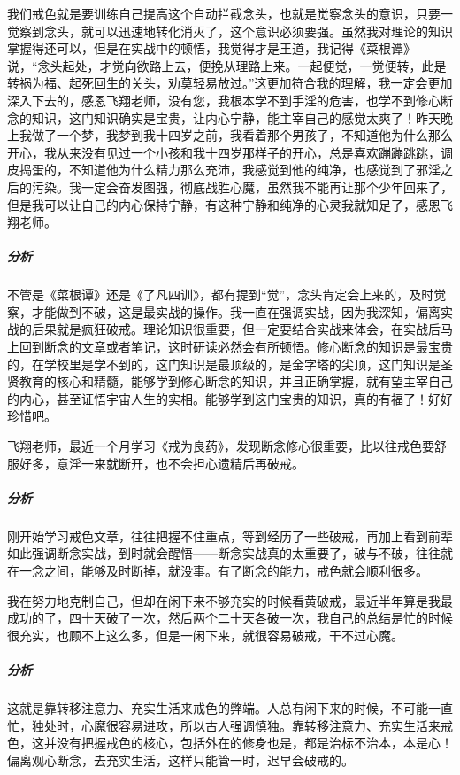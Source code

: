 \begin{case}
    我们戒色就是要训练自己提高这个自动拦截念头，也就是觉察念头的意识，只要一觉察到念头，就可以迅速地转化消灭了，这个意识必须要强。虽然我对理论的知识掌握得还可以，但是在实战中的顿悟，我觉得才是王道，我记得《菜根谭》说，“念头起处，才觉向欲路上去，便挽从理路上来。一起便觉，一觉便转，此是转祸为福、起死回生的关头，劝莫轻易放过。”这更加符合我的理解，我一定会更加深入下去的，感恩飞翔老师，没有您，我根本学不到手淫的危害，也学不到修心断念的知识，这门知识确实是宝贵，让内心宁静，能主宰自己的感觉太爽了！昨天晚上我做了一个梦，我梦到我十四岁之前，我看着那个男孩子，不知道他为什么那么开心，我从来没有见过一个小孩和我十四岁那样子的开心，总是喜欢蹦蹦跳跳，调皮捣蛋的，不知道他为什么精力那么充沛，我感觉到他的纯净，也感觉到了邪淫之后的污染。我一定会奋发图强，彻底战胜心魔，虽然我不能再让那个少年回来了，但是我可以让自己的内心保持宁静，有这种宁静和纯净的心灵我就知足了，感恩飞翔老师。
    \subparagraph{分析} 不管是《菜根谭》还是《了凡四训》，都有提到“觉”，念头肯定会上来的，及时觉察，才能做到不破，这是最实战的操作。我一直在强调实战，因为我深知，偏离实战的后果就是疯狂破戒。理论知识很重要，但一定要结合实战来体会，在实战后马上回到断念的文章或者笔记，这时研读必然会有所顿悟。修心断念的知识是最宝贵的，在学校里是学不到的，这门知识是最顶级的，是金字塔的尖顶，这门知识是圣贤教育的核心和精髓，能够学到修心断念的知识，并且正确掌握，就有望主宰自己的内心，甚至证悟宇宙人生的实相。能够学到这门宝贵的知识，真的有福了！好好珍惜吧。
\end{case}

\begin{case}
    飞翔老师，最近一个月学习《戒为良药》，发现断念修心很重要，比以往戒色要舒服好多，意淫一来就断开，也不会担心遗精后再破戒。
    \subparagraph{分析} 刚开始学习戒色文章，往往把握不住重点，等到经历了一些破戒，再加上看到前辈如此强调断念实战，到时就会醒悟——断念实战真的太重要了，破与不破，往往就在一念之间，能够及时断掉，就没事。有了断念的能力，戒色就会顺利很多。
\end{case}

\begin{case}
    我在努力地克制自己，但却在闲下来不够充实的时候看黄破戒，最近半年算是我最成功的了，四十天破了一次，然后两个二十天各破一次，我自己的总结是忙的时候很充实，也顾不上这么多，但是一闲下来，就很容易破戒，干不过心魔。
    \subparagraph{分析} 这就是靠转移注意力、充实生活来戒色的弊端。人总有闲下来的时候，不可能一直忙，独处时，心魔很容易进攻，所以古人强调慎独。靠转移注意力、充实生活来戒色，这并没有把握戒色的核心，包括外在的修身也是，都是治标不治本，本是心！偏离观心断念，去充实生活，这样只能管一时，迟早会破戒的。
\end{case}

